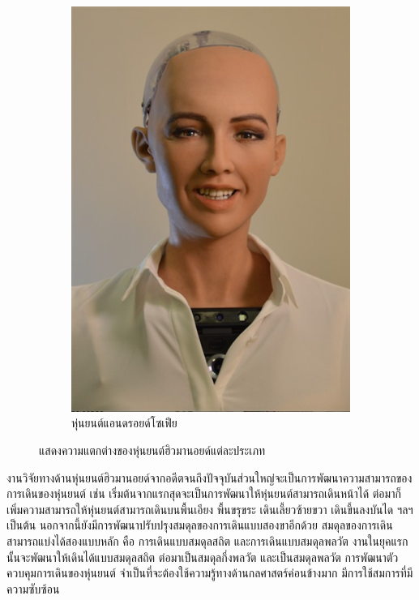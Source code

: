 \begin{figure}[!ht]
\begin{subfigure}[b]{0.3\textwidth}
        \includegraphics[width=\textwidth]{chapter2/images/โซเฟีย.jpg}
        \caption{หุ่นยนต์แอนดรอยด์โซเฟีย}
        \label{fig:sophia}
    \end{subfigure}
    \caption{แสดงความแตกต่างของหุ่นยนต์ฮิวมานอยด์แต่ละประเภท}
    \label{fig:diff_humanoid}
\end{figure}

งานวิจัยทางด้านหุ่นยนต์ฮิวมานอยด์จากอดีตจนถึงปัจจุบันส่วนใหญ่จะเป็นการพัฒนาความสามารถของการเดินของหุ่นยนต์
เช่น เริ่มต้นจากแรกสุดจะเป็นการพัฒนาให้หุ่นยนต์สามารถเดินหน้าได้ ต่อมาก็เพิ่มความสามารถให้หุ่นยนต์สามารถเดินบนพื้นเอียง พื้นขรุขระ
เดินเลี้ยวซ้ายขวา เดินขึ้นลงบันได ฯลฯ เป็นต้น นอกจากนี้ยังมีการพัฒนาปรับปรุงสมดุลของการเดินแบบสองขาอีกด้วย สมดุลของการเดินสามารถแบ่งได้สองแบบหลัก
คือ การเดินแบบสมดุลสถิต และการเดินแบบสมดุลพลวัต งานในยุคแรกนั้นจะพัฒนาให้เดินได้แบบสมดุลสถิต ต่อมาเป็นสมดุลกึ่งพลวัต
และเป็นสมดุลพลวัต การพัฒนาตัวควบคุมการเดินของหุ่นยนต์ จำเป็นที่จะต้องใช้ความรู้ทางด้านกลศาสตร์ค่อนข้างมาก มีการใช้สมการที่มีความซับซ้อน

